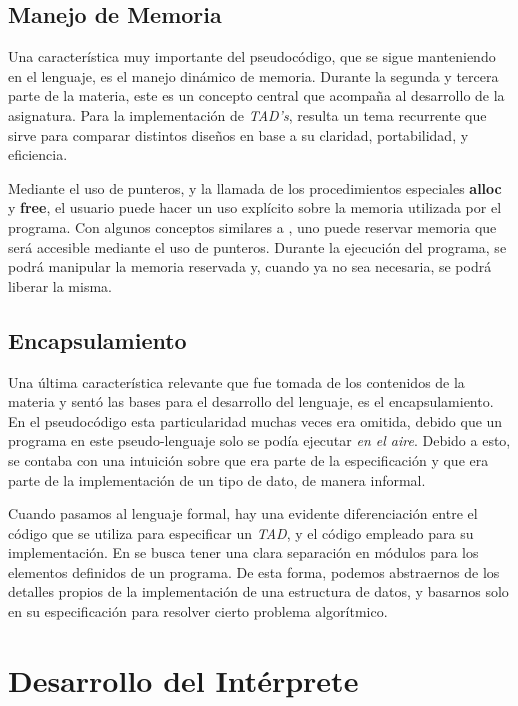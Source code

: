 \subsection{Manejo de Memoria}

Una característica muy importante del pseudocódigo, que se sigue manteniendo en el lenguaje, es el manejo dinámico de memoria.
Durante la segunda y tercera parte de la materia, este es un concepto central que acompaña al desarrollo de la asignatura.
Para la implementación de \textit{TAD's}, resulta un tema recurrente que sirve para comparar distintos diseños en base a su claridad, portabilidad, y eficiencia.

Mediante el uso de punteros, y la llamada de los procedimientos especiales \textbf{alloc} y \textbf{free}, el usuario puede hacer un uso explícito sobre la memoria utilizada por el programa.
Con algunos conceptos similares a \C{}, uno puede reservar memoria que será accesible mediante el uso de punteros.
Durante la ejecución del programa, se podrá manipular la memoria reservada y, cuando ya no sea necesaria, se podrá liberar la misma.

\subsection{Encapsulamiento}

Una última característica relevante que fue tomada de los contenidos de la materia y sentó las bases para el desarrollo del lenguaje, es el encapsulamiento.
En el pseudocódigo esta particularidad muchas veces era omitida, debido que un programa en este pseudo-lenguaje solo se podía ejecutar \textit{en el aire}.
Debido a esto, se contaba con una intuición sobre que era parte de la especificación y que era parte de la implementación de un tipo de dato, de manera informal.

Cuando pasamos al lenguaje formal, hay una evidente diferenciación entre el código que se utiliza para especificar un \textit{TAD}, y el código empleado para su implementación.
En \Lenguaje{} se busca tener una clara separación en módulos para los elementos definidos de un programa.
De esta forma, podemos abstraernos de los detalles propios de la implementación de una estructura de datos, y basarnos solo en su especificación para resolver cierto problema algorítmico.

\section{Desarrollo del Intérprete}

